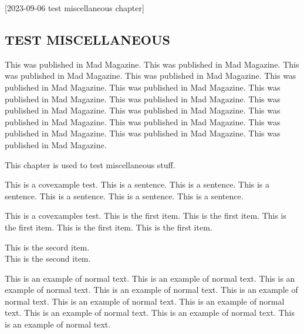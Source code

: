 [2023-09-06 test miscellaneous chapter]

\begin{refsection}

\chapter{TEST MISCELLANEOUS}

\newenvironment
  {chapteracknowledgement}%
  {%
    \bgroup
      \ZZbaselinestretch{1}%
      \vspace*{0.2\baselineskip}%
      \addtolength{\leftskip}{0.5in}%
      \addtolength{\rightskip}{0.5in}%
      \addtolength{\textwidth}{-1in}%
  }%
  {%
      \endgraf
      \vspace*{0.45\baselineskip}
    \egroup
  }
  
\begin{chapteracknowledgement}
  This was published in Mad Magazine.
  This was published in Mad Magazine.
  This was published in Mad Magazine.
  This was published in Mad Magazine.
  This was published in Mad Magazine.
  This was published in Mad Magazine.
  This was published in Mad Magazine.
  This was published in Mad Magazine.
  This was published in Mad Magazine.
  This was published in Mad Magazine.
  This was published in Mad Magazine.
  This was published in Mad Magazine.
  This was published in Mad Magazine.
  This was published in Mad Magazine.
  This was published in Mad Magazine.
\end{chapteracknowledgement}


This chapter is used to test miscellaneous stuff.  

\begin{covexample}
  This is a covexample test.
  This is a sentence.
  This is a sentence.
  This is a sentence.
  This is a sentence.
  This is a sentence.
  This is a sentence.
\end{covexample}

\begin{covexamples}
  \item
    This is a covexamples test.
    This is the first item.
    This is the first item.
    This is the first item.
    This is the first item.
    This is the first item.
  \item
    This is the secord item.\\
    This is the second item.
\end{covexamples}

This is an example of normal text.
This is an example of normal text.
This is an example of normal text.
This is an example of normal text.
This is an example of normal text.
This is an example of normal text.
This is an example of normal text.
This is an example of normal text.
This is an example of normal text.
This is an example of normal text.


\end{refsection}
